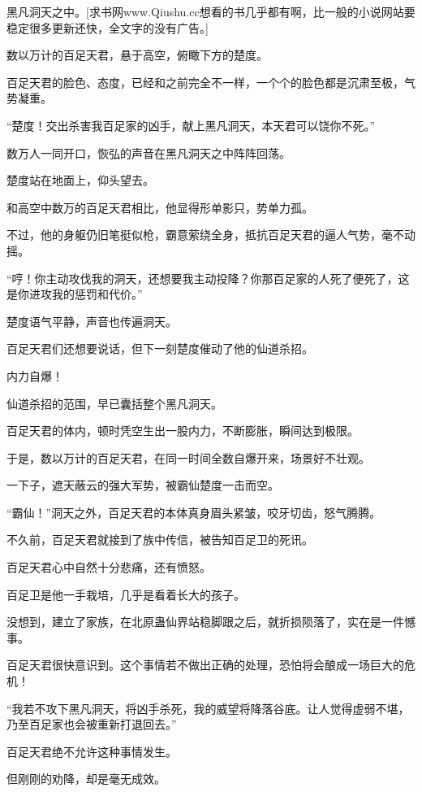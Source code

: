
\begin{this_body}

黑凡洞天之中。[求书网www.Qiushu.cc想看的书几乎都有啊，比一般的小说网站要稳定很多更新还快，全文字的没有广告。]

数以万计的百足天君，悬于高空，俯瞰下方的楚度。

百足天君的脸色、态度，已经和之前完全不一样，一个个的脸色都是沉肃至极，气势凝重。

“楚度！交出杀害我百足家的凶手，献上黑凡洞天，本天君可以饶你不死。”

数万人一同开口，恢弘的声音在黑凡洞天之中阵阵回荡。

楚度站在地面上，仰头望去。

和高空中数万的百足天君相比，他显得形单影只，势单力孤。

不过，他的身躯仍旧笔挺似枪，霸意萦绕全身，抵抗百足天君的逼人气势，毫不动摇。

“哼！你主动攻伐我的洞天，还想要我主动投降？你那百足家的人死了便死了，这是你进攻我的惩罚和代价。”

楚度语气平静，声音也传遍洞天。

百足天君们还想要说话，但下一刻楚度催动了他的仙道杀招。

内力自爆！

仙道杀招的范围，早已囊括整个黑凡洞天。

百足天君的体内，顿时凭空生出一股内力，不断膨胀，瞬间达到极限。

于是，数以万计的百足天君，在同一时间全数自爆开来，场景好不壮观。

一下子，遮天蔽云的强大军势，被霸仙楚度一击而空。

“霸仙！”洞天之外，百足天君的本体真身眉头紧皱，咬牙切齿，怒气腾腾。

不久前，百足天君就接到了族中传信，被告知百足卫的死讯。

百足天君心中自然十分悲痛，还有愤怒。

百足卫是他一手栽培，几乎是看着长大的孩子。

没想到，建立了家族，在北原蛊仙界站稳脚跟之后，就折损陨落了，实在是一件憾事。

百足天君很快意识到。这个事情若不做出正确的处理，恐怕将会酿成一场巨大的危机！

“我若不攻下黑凡洞天，将凶手杀死，我的威望将降落谷底。让人觉得虚弱不堪，乃至百足家也会被重新打退回去。”

百足天君绝不允许这种事情发生。

但刚刚的劝降，却是毫无成效。


\end{this_body}
